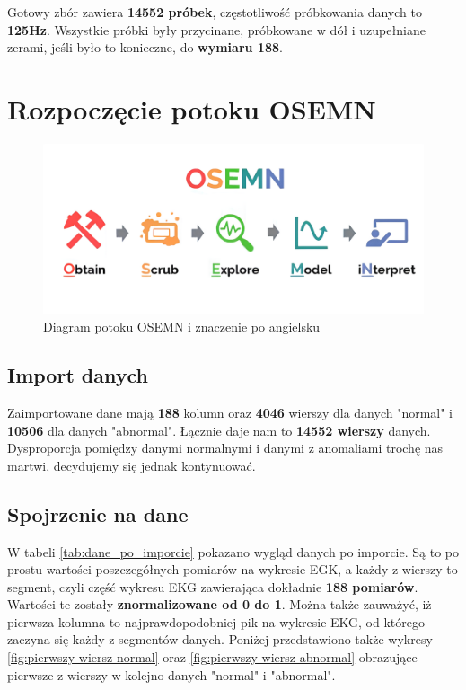 \documentclass[12pt,a4paper]{article}
\begin{document}
Gotowy zbór zawiera \textbf{14552 próbek}, częstotliwość próbkowania danych to \textbf{125Hz}. Wszystkie próbki były przycinane, próbkowane w dół i uzupełniane zerami, jeśli było to konieczne, do \textbf{wymiaru 188}.


\section{Rozpoczęcie potoku OSEMN}
\begin{figure}[h]
    \centering
    \includegraphics[width=1\linewidth]{images/osemn.png}
    \caption{Diagram potoku OSEMN i znaczenie po angielsku \cite{osemn}}
\end{figure}

\subsection{Import danych}
Zaimportowane dane mają \textbf{188} kolumn oraz \textbf{4046} wierszy dla danych "normal" i \textbf{10506} dla danych "abnormal". Łącznie daje nam to \textbf{14552 wierszy} danych. Dysproporcja pomiędzy danymi normalnymi i danymi z anomaliami trochę nas martwi, decydujemy się jednak kontynuować.

\subsection{Spojrzenie na dane}
W tabeli \ref{tab:dane_po_imporcie} pokazano wygląd danych po imporcie. Są to po prostu wartości poszczegółnych pomiarów na wykresie EGK, a każdy z wierszy to segment, czyli część wykresu EKG zawierająca dokładnie \textbf{188 pomiarów}. Wartości te zostały \textbf{znormalizowane od 0 do 1}. Można także zauważyć, iż pierwsza kolumna to najprawdopodobniej pik na wykresie EKG, od którego zaczyna się każdy z segmentów danych. Poniżej przedstawiono także wykresy \ref{fig:pierwszy-wiersz-normal} oraz \ref{fig:pierwszy-wiersz-abnormal} obrazujące pierwsze z wierszy w kolejno danych "normal" i "abnormal".
\end{document}

